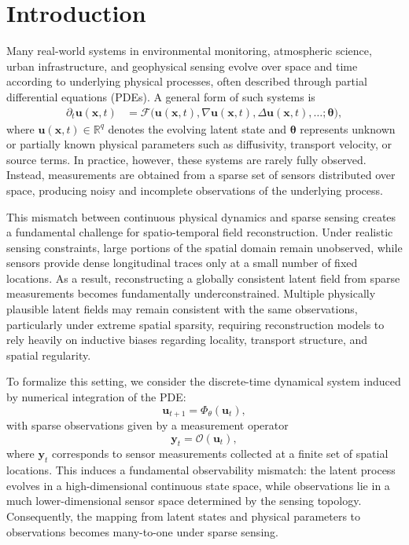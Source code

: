 \section{Introduction}

Many real-world systems in environmental monitoring, atmospheric science, urban infrastructure, and geophysical sensing evolve over space and time according to underlying physical processes, often described through partial differential equations (PDEs). A general form of such systems is
\begin{align}
\partial_t \mathbf{u}(\mathbf{x}, t)
&=
\mathcal{F}\big(
\mathbf{u}(\mathbf{x}, t),
\nabla \mathbf{u}(\mathbf{x}, t),
\Delta \mathbf{u}(\mathbf{x}, t),
\ldots;
\boldsymbol{\theta}
\big),
\end{align}
where $\mathbf{u}(\mathbf{x}, t) \in \mathbb{R}^q$ denotes the evolving latent state and $\boldsymbol{\theta}$ represents unknown or partially known physical parameters such as diffusivity, transport velocity, or source terms. In practice, however, these systems are rarely fully observed. Instead, measurements are obtained from a sparse set of sensors distributed over space, producing noisy and incomplete observations of the underlying process.

This mismatch between continuous physical dynamics and sparse sensing creates a fundamental challenge for spatio-temporal field reconstruction. Under realistic sensing constraints, large portions of the spatial domain remain unobserved, while sensors provide dense longitudinal traces only at a small number of fixed locations. As a result, reconstructing a globally consistent latent field from sparse measurements becomes fundamentally underconstrained. Multiple physically plausible latent fields may remain consistent with the same observations, particularly under extreme spatial sparsity, requiring reconstruction models to rely heavily on inductive biases regarding locality, transport structure, and spatial regularity.

To formalize this setting, we consider the discrete-time dynamical system induced by numerical integration of the PDE:
\[
\mathbf{u}_{t+1} = \Phi_\theta(\mathbf{u}_t),
\]
with sparse observations given by a measurement operator
\[
\mathbf{y}_t = \mathcal{O}(\mathbf{u}_t),
\]
where $\mathbf{y}_t$ corresponds to sensor measurements collected at a finite set of spatial locations. This induces a fundamental observability mismatch: the latent process evolves in a high-dimensional continuous state space, while observations lie in a much lower-dimensional sensor space determined by the sensing topology. Consequently, the mapping from latent states and physical parameters to observations becomes many-to-one under sparse sensing.

